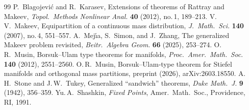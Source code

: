 \documentclass[10pt,a4paper]{amsart}
\begin{document}
\begin{thebibliography}{99}
 P.~Blagojevi\'{c} and R.~Karasev, Extensions of theorems of Rattray and Makeev, \textit{Topol.\ Methods Nonlinear Anal.} \textbf{40} (2012), no.\,1, 189--213.
 V.\,V.~Makeev, Equipartition of a continuous mass distribution, \textit{J.\ Math.\ Sci.} \textbf{140} (2007), no.\,4, 551--557.
 A.~Mej\'{\i}a, S.~Simon, and J.~Zhang, The generalized Makeev problem revisited, \textit{Beitr.\ Algebra Geom.} \textbf{66} (2025), 253--274.
 O.\,R.~Musin, Borsuk--Ulam type theorems for manifolds, \textit{Proc.\ Amer.\ Math.\ Soc.} \textbf{140} (2012), 2551--2560.
 O.\,R.~Musin, Borsuk--Ulam-type theorem for Stiefel manifolds and orthogonal mass partitions, preprint (2026), arXiv:2603.18550.
 A.\,H.~Stone and J.\,W.~Tukey, Generalized ``sandwich'' theorems, \textit{Duke Math.\ J.} \textbf{9} (1942), 356--359.
 Yu.\,A.~Shashkin, \textit{Fixed Points}, Amer.\ Math.\ Soc., Providence, RI, 1991.
\end{thebibliography}
\end{document}
